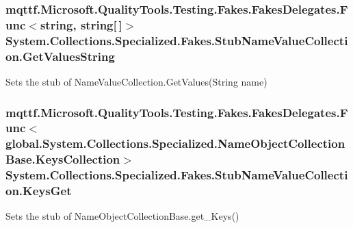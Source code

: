 \hypertarget{class_system_1_1_collections_1_1_specialized_1_1_fakes_1_1_stub_name_value_collection_a8aedfe165a5f73f88f6bbfed70b9081f}{
\subsubsection[{Get\-Values\-String}]{\setlength{\rightskip}{0pt plus 5cm}mqttf.\-Microsoft.\-Quality\-Tools.\-Testing.\-Fakes.\-Fakes\-Delegates.\-Func$<$string, string\mbox{[}$\,$\mbox{]}$>$ System.\-Collections.\-Specialized.\-Fakes.\-Stub\-Name\-Value\-Collection.\-Get\-Values\-String}}\label{class_system_1_1_collections_1_1_specialized_1_1_fakes_1_1_stub_name_value_collection_a8aedfe165a5f73f88f6bbfed70b9081f}


Sets the stub of Name\-Value\-Collection.\-Get\-Values(\-String name)

\hypertarget{class_system_1_1_collections_1_1_specialized_1_1_fakes_1_1_stub_name_value_collection_aa8e8711d1224e548aa96ba1802a69a8b}{
\subsubsection[{Keys\-Get}]{\setlength{\rightskip}{0pt plus 5cm}mqttf.\-Microsoft.\-Quality\-Tools.\-Testing.\-Fakes.\-Fakes\-Delegates.\-Func$<$global.\-System.\-Collections.\-Specialized.\-Name\-Object\-Collection\-Base.\-Keys\-Collection$>$ System.\-Collections.\-Specialized.\-Fakes.\-Stub\-Name\-Value\-Collection.\-Keys\-Get}}\label{class_system_1_1_collections_1_1_specialized_1_1_fakes_1_1_stub_name_value_collection_aa8e8711d1224e548aa96ba1802a69a8b}


Sets the stub of Name\-Object\-Collection\-Base.\-get\-\_\-\-Keys()

